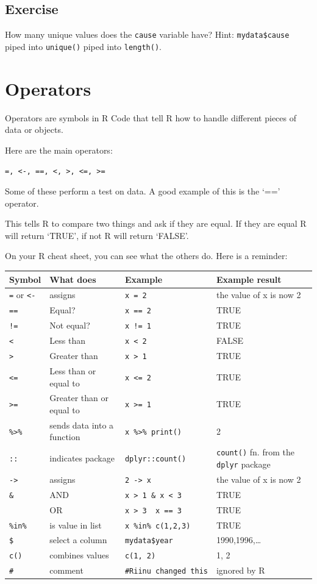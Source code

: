 \documentclass[]{book}
\begin{document}
\subsection{Exercise}\label{exercise-5}

How many unique values does the \texttt{cause} variable have? Hint:
\texttt{mydata\$cause} piped into \texttt{unique()} piped into
\texttt{length()}.

\section{Operators}\label{operators}

Operators are symbols in R Code that tell R how to handle different
pieces of data or objects.

Here are the main operators:

\texttt{=,\ \textless{}-,\ ==,\ \textless{},\ \textgreater{},\ \textless{}=,\ \textgreater{}=}

Some of these perform a test on data. A good example of this is the `=='
operator.

This tells R to compare two things and ask if they are equal. If they
are equal R will return `TRUE', if not R will return `FALSE'.

On your R cheat sheet, you can see what the others do. Here is a
reminder:

\begin{longtable}[]{@{}llll@{}}
\toprule
Symbol & What does & Example & Example result\tabularnewline
\midrule
\endhead
\texttt{=} or \texttt{\textless{}-} & assigns & \texttt{x\ =\ 2} & the
value of x is now 2\tabularnewline
\texttt{==} & Equal? & \texttt{x\ ==\ 2} & TRUE\tabularnewline
\texttt{!=} & Not equal? & \texttt{x\ !=\ 1} & TRUE\tabularnewline
\texttt{\textless{}} & Less than & \texttt{x\ \textless{}\ 2} &
FALSE\tabularnewline
\texttt{\textgreater{}} & Greater than & \texttt{x\ \textgreater{}\ 1} &
TRUE\tabularnewline
\texttt{\textless{}=} & Less than or equal to &
\texttt{x\ \textless{}=\ 2} & TRUE\tabularnewline
\texttt{\textgreater{}=} & Greater than or equal to &
\texttt{x\ \textgreater{}=\ 1} & TRUE\tabularnewline
\texttt{\%\textgreater{}\%} & sends data into a function &
\texttt{x\ \%\textgreater{}\%\ print()} & 2\tabularnewline
\texttt{::} & indicates package & \texttt{dplyr::count()} &
\texttt{count()} fn. from the \texttt{dplyr} package\tabularnewline
\texttt{-\textgreater{}} & assigns & \texttt{2\ -\textgreater{}\ x} &
the value of x is now 2\tabularnewline
\texttt{\&} & AND & \texttt{x\ \textgreater{}\ 1\ \&\ x\ \textless{}\ 3}
& TRUE\tabularnewline
\texttt{\textbar{}} & OR &
\texttt{x\ \textgreater{}\ 3\ \textbar{}\ x\ ==\ 3} &
TRUE\tabularnewline
\texttt{\%in\%} & is value in list & \texttt{x\ \%in\%\ c(1,2,3)} &
TRUE\tabularnewline
\texttt{\$} & select a column & \texttt{mydata\$year} &
1990,1996,\ldots{}\tabularnewline
\texttt{c()} & combines values & \texttt{c(1,\ 2)} & 1, 2\tabularnewline
\texttt{\#} & comment & \texttt{\#Riinu\ changed\ this} & ignored by
R\tabularnewline
\bottomrule
\end{longtable}
\end{document}
